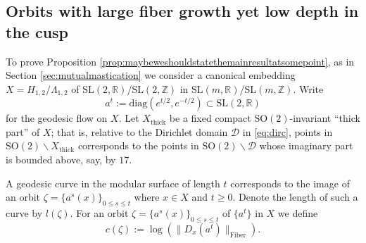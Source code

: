 \documentclass[10pt,reqno]{amsart}
\theoremstyle{Theorem}
\theoremstyle{definition}
\theoremstyle{remark}
\newcommand{\R}{\mathbb {R}}
\newcommand{\Z}{\mathbb {Z}}
\newcommand{\Sl}{\mathrm{SL}}
\newcommand{\So}{\mathrm{SO}}
\def\blue{}
\begin{document}
\subsection{Orbits with large fiber growth yet low depth in the cusp}\label{maximal}


To prove Proposition \ref{prop:maybeweshouldstatethemainresultatsomepoint}, as in Section \ref{sec:mutualmastication} we consider a canonical embedding $X=H_{1,2}/\Lambda_{1,2}$ of $\Sl(2,\R)/\Sl(2, \Z)$ in $\Sl(m,\R)/\Sl(m,\Z)$.
Write  $$a^t := \text{diag}(e^{t/2}, e^{-t/2})\subset \Sl(2,\R)$$ for the geodesic flow on $X$.
Let $X_{\text{thick}}$ be a fixed compact   $\So(2)$-invariant ``thick part'' of $X$;  {\blue that is, relative to the Dirichlet  domain $\mathcal D$ in \eqref{eq:dirc}, points in $\So(2)\backslash X_{\text{thick}}$  corresponds to the points in  $\So(2) \backslash \mathcal D$  whose imaginary part is bounded above, say, by   $17$.}


A geodesic curve in the modular surface of length $t$ corresponds  to the image of  an orbit $\zeta= \{a^s (x)\}_{0\leq s \leq t}$ where $x \in X$ and $t \geq 0$.  Denote the length of such a curve by $l(\zeta)$. For an orbit   $\zeta= \{a^s (x)\}_{0\leq s \leq t}$ of $\{a^t\}$ in $X$ we define $$c(\zeta) := \log (\|D_x(a^t)\|_{\text{Fiber}}).$$
\end{document}
